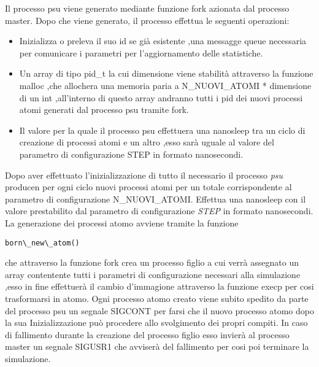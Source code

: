 Il processo psu viene generato mediante funzione fork azionata dal processo master.
Dopo che viene generato, il processo effettua le seguenti operazioni:
\begin{itemize}
    \item Inizializza o preleva il suo id se già esistente ,una messagge queue necessaria per comunicare i parametri per l'aggiornamento delle statistiche. 
    \item Un array di tipo pid\_t la cui dimensione viene stabilità attraverso la funzione malloc ,che allochera una memoria paria a N\_NUOVI\_ATOMI * dimensione di un int ,all'interno di questo array andranno tutti i pid dei nuovi processi atomi generati dal processo psu tramite fork. 
    \item Il valore per la quale il processo psu effettuera una nanosleep tra un ciclo di creazione di processi atomi e un altro ,esso sarà uguale al valore del parametro di configurazione STEP in formato nanosecondi.
\end{itemize}
Dopo aver effettuato l'inizializzazione di tutto il necessario il processo \textit{psu} producen per ogni ciclo nuovi processi atomi per un totale corrispondente al parametro di configurazione N\_NUOVI\_ATOMI.
Effettua una nanosleep con il valore prestabilito dal parametro di configurazione \textit{STEP} in formato nanosecondi.
La generazione dei processi atomo avviene tramite la funzione \begin{verbatim}born\_new\_atom()\end{verbatim} che attraverso la funzione fork crea un processo figlio a cui verrà assegnato un array contentente tutti i parametri di configurazione necessari alla simulazione ,esso in fine effettuerà il cambio d'immagione attraverso la funzione execp per cosi trasformarsi in atomo.
Ogni processo atomo creato viene subito spedito da parte del processo psu un segnale SIGCONT per farsi che il nuovo processo atomo dopo la sua Inizializzazione può procedere allo svolgimento dei propri compiti. 
In caso di fallimento durante la creazione del processo figlio esso invierà al processo master un segnale SIGUSR1 che avviserà del fallimento per cosi poi terminare la simulazione. 